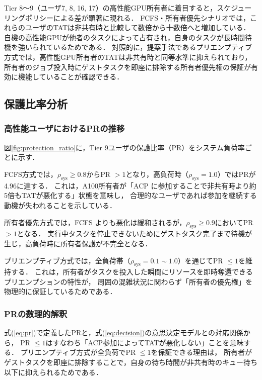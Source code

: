 \documentclass[12pt,a4paper]{jsarticle}
\begin{document}
Tier 8〜9（ユーザ7, 8, 16, 17）の高性能GPU所有者に着目すると，スケジューリングポリシーによる差が顕著に現れる．
FCFS・所有者優先シナリオでは，これらのユーザのTATは非共有時と比較して数倍から十数倍へと増加している．
自機の高性能GPUが他者のタスクによって占有され，自身のタスクが長時間待機を強いられているためである．
対照的に，提案手法であるプリエンプティブ方式では，高性能GPU所有者のTATは非共有時と同等水準に抑えられており，
所有者のジョブ投入時にゲストタスクを即座に排除する所有者優先権の保証が有効に機能していることが確認できる．

\subsection{保護比率分析}

\subsubsection{高性能ユーザにおけるPRの推移}

図\ref{fig:protection_ratio}に，Tier 9ユーザの保護比率（PR）をシステム負荷率ごとに示す．

FCFS方式では，$\rho_\mathrm{sys} \geq 0.8$からPR $> 1$となり，高負荷時（$\rho_\mathrm{sys} = 1.0$）ではPRが4.96に達する．
これは，A100所有者が「ACP に参加することで非共有時より約5倍もTATが悪化する」状態を意味し，
合理的なユーザであれば参加を継続する動機が失われることを示している．

所有者優先方式では，FCFS よりも悪化は緩和されるが，$\rho_\mathrm{sys} \geq 0.9$においてPR $> 1$となる．
実行中タスクを停止できないためにゲストタスク完了まで待機が生じ，高負荷時に所有者保護が不完全となる．

プリエンプティブ方式では，全負荷帯（$\rho_\mathrm{sys} = 0.1 \sim 1.0$）を通じてPR $\leq 1$を維持する．
これは，所有者がタスクを投入した瞬間にリソースを即時奪還できるプリエンプションの特性が，
周囲の混雑状況に関わらず「所有者の優先権」を物理的に保証しているためである．

\subsubsection{PRの数理的解釈}

式(\ref{eq:pr})で定義したPRと，式(\ref{eq:decision})の意思決定モデルとの対応関係から，
PR $\leq 1$はすなわち「ACP参加によってTATが悪化しない」ことを意味する．
プリエンプティブ方式が全負荷でPR $\leq 1$を保証できる理由は，
所有者がゲストタスクを即座に排除することで，自身の待ち時間が非共有時のキュー待ち以下に抑えられるためである．
\end{document}
